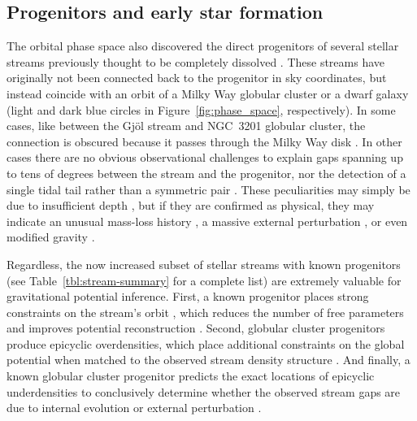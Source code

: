 \documentclass[final,5p,times,twocolumn,authoryear]{elsarticle}
\begin{document}
\subsection{Progenitors and early star formation}
\label{sec:progenitors}
The orbital phase space also discovered the direct progenitors of several stellar streams previously thought to be completely dissolved \citep{palau:2019,riley:2020,ibata:2019b,ibata:2021,bonaca:2021}.
These streams have originally not been connected back to the progenitor in sky coordinates, but instead coincide with an orbit of a Milky Way globular cluster or a dwarf galaxy (light and dark blue circles in Figure~\ref{fig:phase_space}, respectively).
In some cases, like between the Gj\" ol stream and NGC~3201 globular cluster, the connection is obscured because it passes through the Milky Way disk \citep{riley:2020}.
In other cases there are no obvious observational challenges to explain gaps spanning up to tens of degrees between the stream and the progenitor, nor the detection of a single tidal tail rather than a symmetric pair \citep[e.g,][]{bonaca:2021, yang:2022b}.
These peculiarities may simply be due to insufficient depth \citep[e.g., non-detections of the low-mass stars that populate cluster tails in the early phases of dissolution,][]{balbinot:2018}, but if they are confirmed as physical, they may indicate an unusual mass-loss history \citep[e.g., due to a population of black holes in the progenitor,][]{roberts:2024}, a massive external perturbation \citep[e.g., from the Galactic bar,][]{pearson:2017}, or even modified gravity \citep[causing asymmetric escape into the leading and trailing tails,][]{thomas:2018}.

Regardless, the now increased subset of stellar streams with known progenitors (see Table~\ref{tbl:stream-summary} for a complete list) are extremely valuable for gravitational potential inference.
First, a known progenitor places strong constraints on the stream's orbit \citep{bh:2018}, which reduces the number of free parameters and improves potential reconstruction \citep{palau:2023}.
Second, globular cluster progenitors produce epicyclic overdensities, which place additional constraints on the global potential when matched to the observed stream density structure \citep{kupper:2015}.
And finally, a known globular cluster progenitor predicts the exact locations of epicyclic underdensities to conclusively determine whether the observed stream gaps are due to internal evolution or external perturbation \citep[cf.][]{ibata:2020}.
\end{document}
